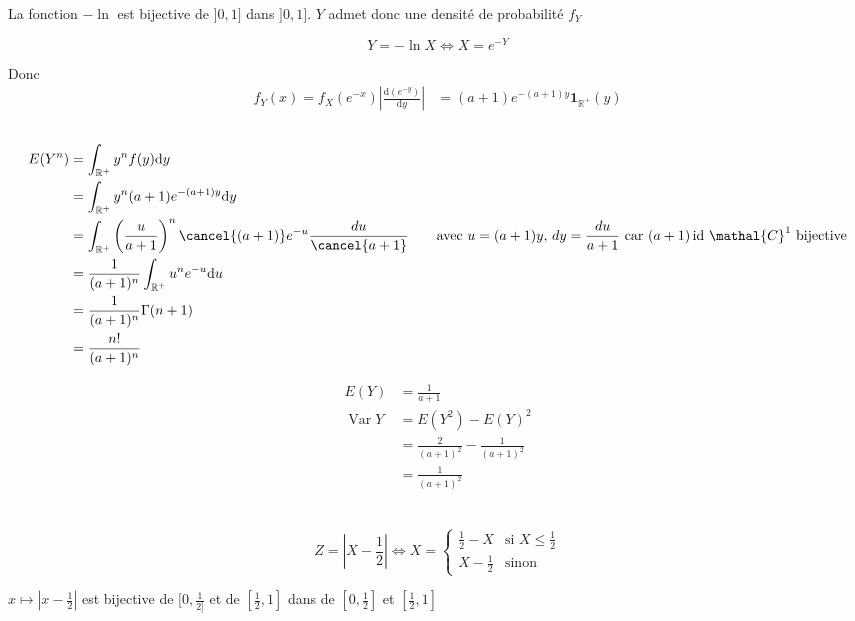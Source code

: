 \documentclass{article}
\newcommand{\R}{\mathbb{R}}
\newcommand{\dy}{\mathrm{d}y}
\newcommand{\var}{\operatorname{Var}}
\begin{document}
La fonction $-\ln$ est bijective de $]0, 1]$ dans $]0, 1]$. $Y$ admet donc une densité de probabilité $f_Y$

\[
	Y = -\ln X \iff X = e^{- Y}
\] 


Donc 
\begin{align*}
	f_Y(x) = f_X(e^{-x}) \left| \frac{\mathrm{d} (e^{-y})}{\dy} \right|
	&= (a+1)e^{-(a+1)y} \mathbf{1}_{\R^{+}}(y)
\end{align*}

\subsection{}

\begin{align*}
	E(Y^n) &= \int_{\R^{+}} y^n f(y)\dy \\
	       &= \int_{\R^{+}} y^n (a+1) e^{-(a+1)y}\dy \\
	       &= \int_{\R^{+}} \left( \frac{u}{a+1} \right)^{n} \cancel{(a+1)} e^{-u} \frac{du}{\cancel{a+1}} \qquad \text{avec $u = (a+1)y$,  $dy = \frac{du}{a+1}$ car $(a+1)\operatorname{id}$  $\mathal{C}^{1}$ bijective} \\
	       &= \frac{1}{(a+1)^n} \int_{\R^{+}} u^n e^{-u} \mathrm{d}u \\
	       &= \frac{1}{(a+1)^n} \Gamma(n+1) \\
	       &= \frac{n!}{(a+1)^n} \\
\end{align*}

\begin{align*}
	E(Y) &= \frac{1}{a+1} \\
	\var Y &= E(Y^2) - E(Y)^2 \\
	       &= \frac{2}{(a+1)^2} - \frac{1}{(a+1)^2} \\
	       &= \frac{1}{(a+1)^2} \\
\end{align*}

\subsection{}

\[
	Z = \left|X-\frac{1}{2}\right| \iff X = \begin{cases}
			 \frac{1}{2} - X &\text{si } X \le  \frac{1}{2} \\
			 X - \frac{1}{2 }&\text{sinon}
		 \end{cases}
\] 

$x \mapsto |x-\frac{1}{2}|$ est bijective de $[0, \frac{1}{2]}$ et de $[\frac{1}{2}, 1]$ dans de $[0, \frac{1}{2}]$ et $[\frac{1}{2}, 1]$
\end{document}
